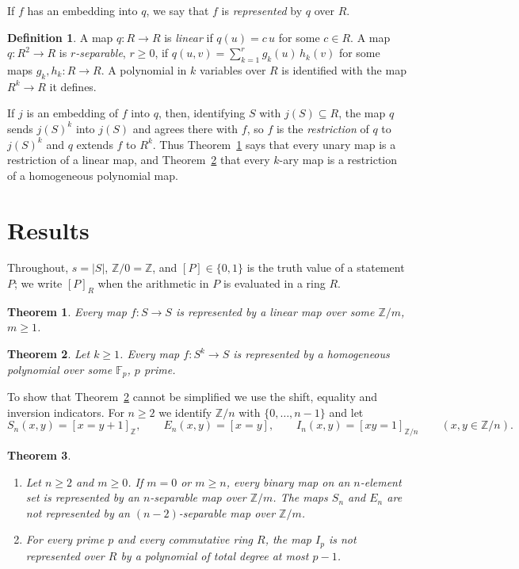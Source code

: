 \documentclass[11pt]{article}
\newtheorem{theorem}{Theorem}
\theoremstyle{definition}
\newtheorem{definition}{Definition}
\newcommand{\Z}{\mathbb{Z}}
\newcommand{\F}{\mathbb{F}}
\begin{document}
If $f$ has an embedding into $q$, we say that $f$ is \emph{represented} by $q$ over $R$.

\begin{definition}
A map $q\colon R\to R$ is \emph{linear} if $q(u)=c\,u$ for some $c\in R$. A map
$q\colon R^2\to R$ is \emph{$r$-separable}, $r\ge 0$, if $q(u,v)=\sum_{k=1}^{r}g_k(u)\,h_k(v)$
for some maps $g_k,h_k\colon R\to R$. A polynomial in $k$ variables over $R$ is identified with
the map $R^k\to R$ it defines.
\end{definition}

If $j$ is an embedding of $f$ into $q$, then, identifying $S$ with $j(S)\subseteq R$, the map $q$ sends $j(S)^k$ into $j(S)$ and
agrees there with $f$, so $f$ is the \emph{restriction} of $q$ to $j(S)^k$ and $q$ extends $f$
to $R^k$. Thus Theorem~\ref{thm:unary} says that every unary map is a restriction of a linear
map, and Theorem~\ref{thm:binary} that every $k$-ary map is a restriction of a homogeneous
polynomial map.

\section{Results}

Throughout, $s=|S|$, $\Z/0=\Z$, and $[P]\in\{0,1\}$ is the truth value of a statement $P$; we write
$[P]_R$ when the arithmetic in $P$ is evaluated in a ring $R$.

\begin{theorem}\label{thm:unary}
Every map $f\colon S\to S$ is represented by a linear map over some $\Z/m$, $m\ge 1$.
\end{theorem}

\begin{theorem}\label{thm:binary}
Let $k\ge 1$. Every map $f\colon S^k\to S$ is represented by a homogeneous polynomial over some
$\F_p$, $p$ prime.
\end{theorem}

To show that Theorem~\ref{thm:binary} cannot be simplified we use the shift, equality and
inversion indicators. For $n\ge 2$ we identify $\Z/n$ with $\{0,\dots,n-1\}$ and let
\[
  S_n(x,y)=[x=y+1]_\Z,\qquad E_n(x,y)=[x=y],\qquad I_n(x,y)=[xy=1]_{\Z/n}\qquad(x,y\in\Z/n).
\]

\begin{theorem}\label{thm:optimal}
\begin{enumerate}
\item[(a)] Let $n\ge 2$ and $m\ge 0$. If $m=0$ or $m\ge n$, every binary map on an $n$-element
set is represented by an $n$-separable map over $\Z/m$. The maps $S_n$ and $E_n$ are not
represented by an $(n-2)$-separable map over $\Z/m$.
\item[(b)] For every prime $p$ and every commutative ring $R$, the map $I_p$ is not represented
over $R$ by a polynomial of total degree at most $p-1$.
\end{enumerate}
\end{theorem}
\end{document}
